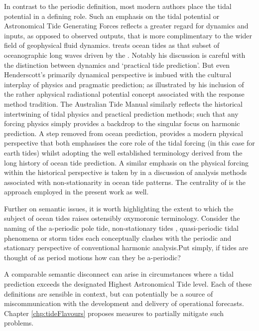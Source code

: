 In contrast to the periodic definition, most modern authors place the tidal potential in a defining role. Such an emphasis on the tidal potential or Astronomical Tide Generating Forces \ATGP{} reflects a greater regard for dynamics and inputs, as opposed to observed outputs, that is more complimentary to the wider field of geophysical fluid dynamics.  
\citet{Hendershott:1981ub} treats ocean tides as that subset of oceanographic long waves driven by the \ATGP{}.  Notably his discussion is careful with the distinction between dynamics and `practical tide prediction'. But even Henderscott's primarily dynamical perspective is imbued with the cultural interplay of physics and pragmatic prediction; as illustrated by his inclusion of the rather aphysical radiational potential concept associated with the \citet{Munk:1966ts} response method tradition.
The Australian Tide Manual \citep{PCTMSL-sp9} similarly reflects the historical intertwining of tidal physics and practical prediction methods; such that any forcing physics simply provides a backdrop to the singular focus on harmonic prediction.   
A step removed from ocean prediction, \citet{agnew2015} provides a modern physical perspective that both emphasises the core role of the tidal forcing (in this case for earth tides) whilst adopting the well established terminology derived from the long history of ocean tide prediction. A similar emphasis on the physical forcing within the historical perspective is taken by \citet{Flinchem:2000kp} in a  discussion of analysis methods associated with non-stationarity in ocean tide patterns.
The centrality of \ATGP{} is the approach employed in the present work as well.

Further on semantic issues, it is worth highlighting the extent to which the subject of ocean tides raises ostensibly oxymoronic terminology.  
Consider the naming of the a-periodic pole tide, non-stationary tides \citep{Ray:2011tj}, quasi-periodic tidal phenomena \citep{Flinchem:2000kp} or storm tides \citep{Horsburgh:2008gw} each conceptually clashes with the periodic and stationary perspective of conventional harmonic analysis.Put simply, if tides are thought of as period motions how can they be a-periodic?

A comparable semantic disconnect can arise in circumstances where a tidal prediction exceeds the designated Highest Astronomical Tide level.   
Each of these definitions are sensible in context, but can potentially be a source of miscommunication with the development and delivery of operational forecasts.    Chapter \ref{chp:tideFlavours} proposes measures to partially mitigate such problems.


